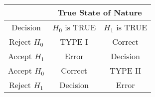 \documentclass[border=12pt]{standalone}
\begin{document}
\begin{tabular}{|c|c|c|}
	\hline
	&\multicolumn{2}{c|}{True State of Nature}\\
	\hline
	Decision & $H_0$ is TRUE & $H_1$ is TRUE\\
	\hline
	{\color{blue} Reject $H_0$}& TYPE I  & Correct  \\
	{\color{red} Accept $H_1$} & Error & Decision\\
	\hline
	{\color{blue} Accept $H_0$}& Correct  & TYPE II  \\
	{\color{red} Reject $H_1$} & Decision &  Error\\
	\hline
\end{tabular}
\end{document}
